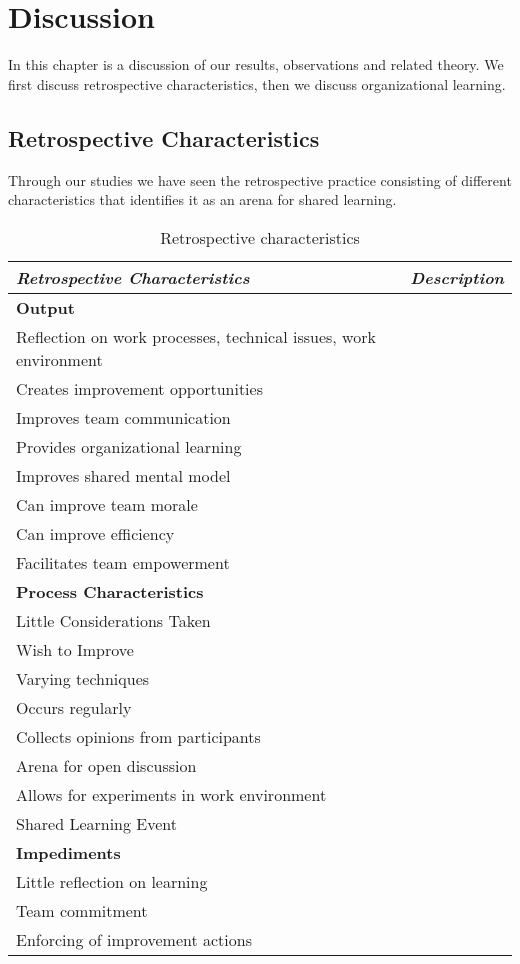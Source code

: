 \chapter{Discussion}

In this chapter is a discussion of our results, observations and related theory. We first discuss retrospective characteristics, then we discuss organizational learning.


\section{Retrospective Characteristics}
Through our studies we have seen the retrospective practice consisting of different characteristics that identifies it as an arena for shared learning.  

\begin{table}[h]
	\begin{center}
		\caption{Retrospective characteristics}
		\label{table:retrospective-properties}
		\begin{tabular}{p{} p{}}
			\hline
			\textit{Retrospective Characteristics} & \textit{Description} \\
			\hline
			\textbf{Output} & \\
			Reflection on work processes, technical issues, work environment & \\
			Creates improvement opportunities & \\
			Improves team communication  & \\
			Provides organizational learning & \\
			Improves shared mental model & \\
			Can improve team morale & \\ 
			Can improve efficiency & \\
			Facilitates team empowerment & \\
			\hline 
			\textbf{Process Characteristics} & \\
			Little Considerations Taken & \\
			Wish to Improve & \\
			Varying techniques & \\
			Occurs regularly & \\
			Collects opinions from participants & \\
			Arena for open discussion & \\
			Allows for experiments in work environment & \\
			Shared Learning Event & \\
			\hline
			\textbf{Impediments} & \\
			Little reflection on learning & \\
			Team commitment & \\
			Enforcing of improvement actions & \\
			\hline
		\end{tabular}
	\end{center}
\end{table}

